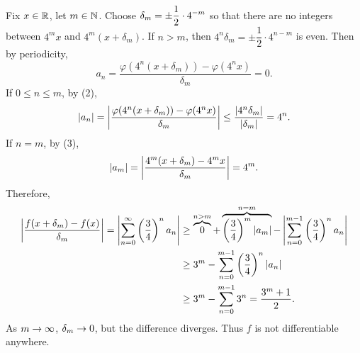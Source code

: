 Fix \(x \in \mathbb{R}\), let \(m \in \mathbb{N}\). Choose \(\displaystyle \delta_m = \pm \frac{1}{2}\cdot 4^{-m}\) so that there are no integers between \(4^mx\) and \(4^m(x + \delta_m)\). If \(n > m\), then \(4^n \delta_m = \pm \dfrac{1}{2}\cdot 4^{n - m}\) is even. Then by periodicity,
\[
    a_n = \frac{\varphi(4^n(x+\delta_m)) - \varphi(4^n x)}{\delta_m} = 0.
\]
If \(0 \leq n \leq m\), by (2),
\[
    \left| a_n \right| = \left| \frac{\varphi(4^n(x+\delta_m)) - \varphi(4^n x)}{\delta_m} \right| \leq \frac{\left| 4^n \delta_m \right|}{\left| \delta_m \right|} = 4^n.
\]
If \(n = m\), by (3),
\[
    \left| a_m \right| = \left| \frac{4^m(x + \delta_m) - 4^mx}{\delta_m} \right| = 4^m.
\]
Therefore,
\[
    \begin{aligned}
        \left| \frac{f(x + \delta_m) - f(x)}{\delta_m} \right| = \left| \sum_{n = 0}^\infty \left(\frac{3}{4}\right)^n a_n \right| & \geq \overbrace{0}^{n > m} + \overbrace{\left(\frac{3}{4}\right)^m \left| a_m \right|}^{n = m} - \left| \sum_{n=0}^{m-1}\left(\frac{3}{4}\right)^n a_n \right| \\
                                                                                                                 & \geq 3^m - \sum_{n=0}^{m-1} \left(\frac{3}{4}\right)^n \left| a_n \right|                                                                             \\
                                                                                                                 & \geq 3^m - \sum_{n=0}^{m-1} 3^n = \frac{3^m + 1}{2}.
    \end{aligned}
\]
As \(m \rightarrow \infty\), \(\delta_m \rightarrow 0\), but the difference diverges. Thus \(f\) is not differentiable anywhere.

\pagebreak
